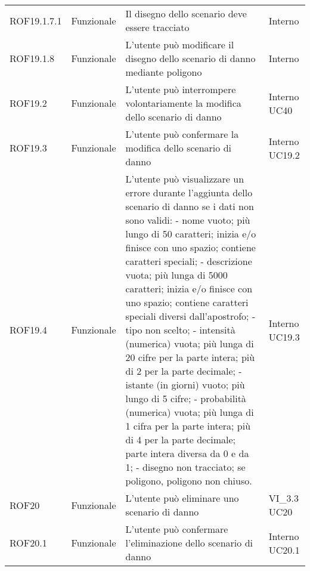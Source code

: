 \begin{longtable}{p{2cm}!{\VRule[1pt]}p{2cm}!{\VRule[1pt]}p{5cm}!{\VRule[1pt]}p{1.5cm}}
	ROF19.1.7.1                      & Funzionale\newline               & Il disegno dello scenario deve essere tracciato                                                                           & Interno                      \\
	ROF19.1.8                        & Funzionale\newline               & L'utente può modificare il disegno dello scenario di danno mediante poligono                                             & Interno                      \\
	ROF19.2                          & Funzionale\newline               & L'utente può interrompere volontariamente la modifica dello scenario di danno                                            & Interno \newline UC40        
	\\
	ROF19.3                          & Funzionale\newline               & L'utente può confermare la modifica dello scenario di danno                                                              & Interno \newline UC19.2      
	\\
	ROF19.4&Funzionale\newline  & L'utente può visualizzare un errore durante l'aggiunta dello scenario di danno se i dati non sono validi:
	- nome vuoto; più lungo di 50 caratteri; inizia e/o
	finisce con uno spazio; contiene caratteri speciali;
	- descrizione vuota; più lunga di 5000 caratteri;
	inizia e/o finisce con uno spazio; contiene
	caratteri speciali diversi dall'apostrofo;
	- tipo non scelto;
	- intensità (numerica) vuota; più lunga di 20 cifre per la
	parte intera; più di 2 per la parte decimale;
	- istante (in giorni) vuoto; più lungo di 5 cifre;
	- probabilità (numerica) vuota; più lunga di 1 cifra per la
	parte intera; più di 4 per la parte decimale; parte
	intera diversa da 0 e da 1;
	- disegno non tracciato; se poligono, poligono non
	chiuso. & Interno \newline UC19.3
	\\
		ROF20                            & Funzionale\newline               & L'utente può eliminare uno scenario di danno                                                                             & VI_3.3 \newline UC20         
	\\
	ROF20.1                          & Funzionale\newline               & L'utente può confermare l'eliminazione dello scenario di danno                                                           & Interno \newline UC20.1      

\end{longtable}
